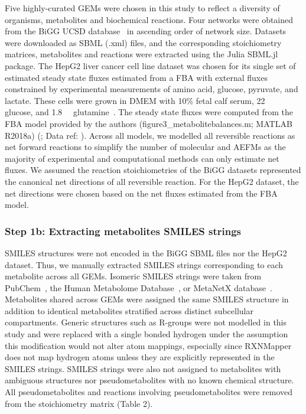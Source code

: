 \documentclass[12pt]{article}
\begin{document}
Five highly-curated GEMs were chosen in this study to reflect a diversity
of organisms, metabolites and biochemical reactions. Four networks were
obtained from the BiGG UCSD database~\citep{KingZacharyA2016BMAp} in
ascending order of network size. Datasets were downloaded as SBML (.xml)
files, and the corresponding stoichiometry matrices, metabolites and
reactions were extracted using the Julia SBML.jl package. The HepG2 liver
cancer cell line dataset was chosen for its single set of estimated steady
state fluxes estimated from a FBA with external fluxes constrained by
experimental measurements of amino acid, glucose, pyruvate, and lactate.
These cells were grown in DMEM with 10\% fetal calf serum,
22\SI{}{\milli\molar} glucose, and 1.8\SI{}{\milli\molar}
glutamine~\citep{NilssonAvlant2020Qaoa}. The steady state fluxes were computed
from the FBA model provided by the authors (figure3\_metabolitebalances.m;
MATLAB R2018a) (\citealt{NilssonAvlant2020Qaoa}; Data ref:
\citealt{NilssonAvlant2020QaoaDATASET}). Across all models, we modelled all
reversible reactions as net forward reactions to simplify the number of
molecular and AEFMs as the majority of experimental and computational methods
can only estimate net fluxes. We assumed the reaction stoichiometries of the
BiGG datasets represented the canonical net directions of all reversible
reaction. For the HepG2 dataset, the net directions were chosen based on the
net fluxes estimated from the FBA model.

\subsubsection*{Step 1b: Extracting metabolites SMILES strings}

SMILES structures were not encoded in the BiGG SBML files nor the HepG2
dataset. Thus, we manually extracted SMILES strings corresponding to each
metabolite across all GEMs. Isomeric SMILES strings were taken from
PubChem~\citep{KimSunghwan2023P2u}, the Human Metabolome
Database~\citep{WishartDavidS2022H5tH}, or MetaNetX
database~\citep{MorettiSebastien2021Munf}. Metabolites shared across GEMs
were assigned the same SMILES structure in addition to identical
metabolites stratified across distinct subcellular compartments. Generic
structures such as R-groups were not modelled in this study and were
replaced with a single bonded hydrogen under the assumption this
modification would not alter atom mappings, especially since RXNMapper
does not map hydrogen atoms unless they are explicitly represented in the
SMILES strings. SMILES strings were also not assigned to metabolites with
ambiguous structures nor pseudometabolites with no known chemical
structure. All pseudometabolites and reactions involving pseudometabolites
were removed from the stoichiometry matrix (Table 2).
\end{document}
